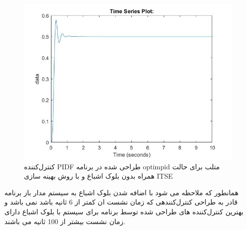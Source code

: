 \begin{figure}[H]
	\centering
	\includegraphics[width=12cm]{../Figure/P_IV/PID_ITAE_without_sat.jpg}
	\caption{‌کنترل‌کننده PIDF طراحی شده در برنامه optimpid متلب برای حالت همراه بدون بلوک اشباع و با روش بهینه سازی ITSE}
\end{figure}



%
همانطور که ملاحظه می شود با اضافه شدن بلوک اشباع به سیستم مدار باز برنامه قادر به طراحی کنترل‌کنندهی که زمان نشست ان کمتر از 6 ثانیه باشد نمی باشد و بهترین کنترل‌کننده های طراحی شده توسط برنامه برای سیستم با بلوک اشباع دارای زمان نشست بیشتر از 100 ثانیه می باشند.
%
%
%
%
%
